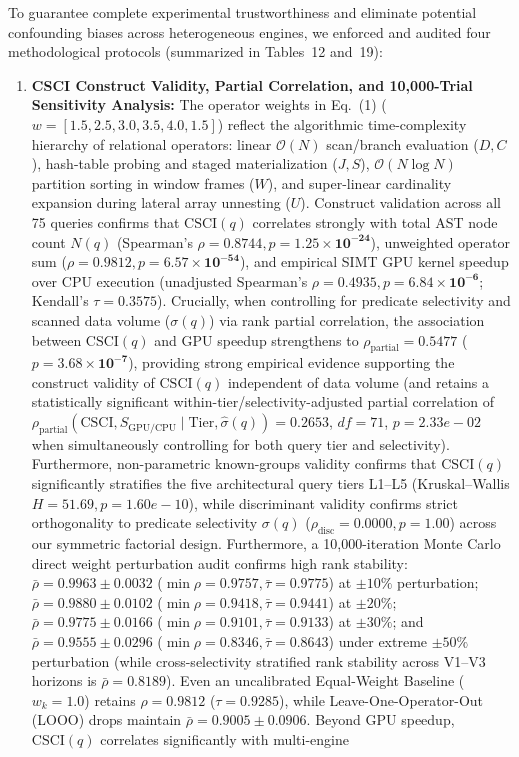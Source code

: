 \documentclass[10pt,a4paper]{article}
\begin{document}
To guarantee complete experimental trustworthiness and eliminate potential confounding biases across heterogeneous engines, we enforced and audited four methodological protocols (summarized in Tables~12 and~19):
\begin{enumerate}[leftmargin=1.5em,itemsep=2pt]
    \item \textbf{CSCI Construct Validity, Partial Correlation, and 10,000-Trial Sensitivity Analysis:} The operator weights in Eq.~(1) ($w = [1.5, 2.5, 3.0, 3.5, 4.0, 1.5]$) reflect the algorithmic time-complexity hierarchy of relational operators: linear $\mathcal{O}(N)$ scan/branch evaluation ($D, C$), hash-table probing and staged materialization ($J, S$), $\mathcal{O}(N \log N)$ partition sorting in window frames ($W$), and super-linear cardinality expansion during lateral array unnesting ($U$). Construct validation across all 75 queries confirms that $\text{CSCI}(q)$ correlates strongly with total AST node count $N(q)$ (Spearman's $\rho = \mathbf{0.8744}, p = \mathbf{1.25 \times 10^{-24}}$), unweighted operator sum ($\rho = \mathbf{0.9812}, p = \mathbf{6.57 \times 10^{-54}}$), and empirical SIMT GPU kernel speedup over CPU execution (unadjusted Spearman's $\rho = \mathbf{0.4935}, p = \mathbf{6.84 \times 10^{-6}}$; Kendall's $\tau = \mathbf{0.3575}$). Crucially, when controlling for predicate selectivity and scanned data volume ($\sigma(q)$) via rank partial correlation, the association between $\text{CSCI}(q)$ and GPU speedup strengthens to $\rho_{\text{partial}} = \mathbf{0.5477}$ ($p = \mathbf{3.68 \times 10^{-7}}$), providing strong empirical evidence supporting the construct validity of $\text{CSCI}(q)$ independent of data volume (and retains a statistically significant within-tier/selectivity-adjusted partial correlation of $\rho_{\text{partial}}(\text{CSCI}, S_{\text{GPU/CPU}} \mid \text{Tier}, \hat{\sigma}(q)) = 0.2653$, $df=71$, $p=2.33e-02$ when simultaneously controlling for both query tier and selectivity). Furthermore, non-parametric known-groups validity confirms that $\text{CSCI}(q)$ significantly stratifies the five architectural query tiers L1--L5 (Kruskal--Wallis $H = 51.69, p = 1.60e-10$), while discriminant validity confirms strict orthogonality to predicate selectivity $\sigma(q)$ ($\rho_{\text{disc}} = 0.0000, p = 1.00$) across our symmetric factorial design. Furthermore, a 10,000-iteration Monte Carlo direct weight perturbation audit confirms high rank stability: $\bar{\rho} = \mathbf{0.9963} \pm 0.0032$ ($\min \rho = 0.9757, \bar{\tau}=0.9775$) at $\pm 10\%$ perturbation; $\bar{\rho} = \mathbf{0.9880} \pm 0.0102$ ($\min \rho = 0.9418, \bar{\tau}=0.9441$) at $\pm 20\%$; $\bar{\rho} = \mathbf{0.9775} \pm 0.0166$ ($\min \rho = 0.9101, \bar{\tau}=0.9133$) at $\pm 30\%$; and $\bar{\rho} = \mathbf{0.9555} \pm 0.0296$ ($\min \rho = 0.8346, \bar{\tau}=0.8643$) under extreme $\pm 50\%$ perturbation (while cross-selectivity stratified rank stability across V1--V3 horizons is $\bar{\rho}=0.8189$). Even an uncalibrated Equal-Weight Baseline ($w_k = 1.0$) retains $\rho = \mathbf{0.9812}$ ($\tau = 0.9285$), while Leave-One-Operator-Out (LOOO) drops maintain $\bar{\rho} = \mathbf{0.9005} \pm 0.0906$. Beyond GPU speedup, $\text{CSCI}(q)$ correlates significantly with multi-engine 
\end{enumerate}
\end{document}
